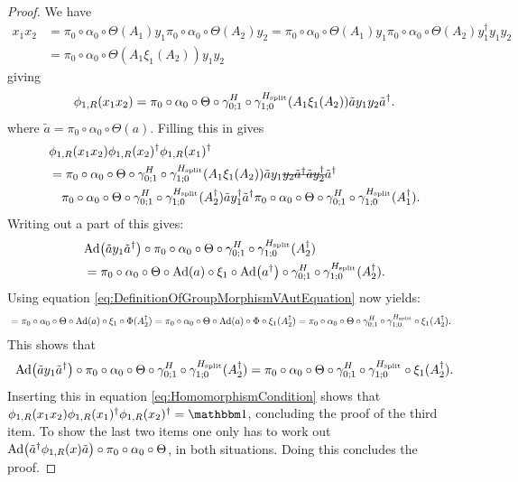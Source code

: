 \documentclass[11pt,a4paper,twoside]{article}
\numberwithin{equation}{section}
\begin{document}
\begin{proof}
		We have
		\begin{align}
			x_1x_2&=\pi_0\circ\alpha_0\circ\Theta(A_1)y_1\pi_0\circ\alpha_0\circ\Theta(A_2)y_2=\pi_0\circ\alpha_0\circ\Theta(A_1)y_1\pi_0\circ\alpha_0\circ\Theta(A_2)y_1^{\dagger}y_1y_2\\
			&=\pi_0\circ\alpha_0\circ\Theta(A_1\xi_1(A_2))y_1y_2
		\end{align}
		giving
		\begin{equation}
			\phi_{1,R}(x_1x_2)=\pi_0\circ\alpha_0\circ\Theta\circ\gamma^H_{0;1}\circ\gamma^{{H_{\text{split}}}}_{1;0}(A_1\xi_1(A_2))\tilde{a}y_1y_2\tilde{a}^\dagger.
		\end{equation}
		where $\tilde{a}=\pi_0\circ\alpha_0\circ\Theta(a)$. Filling this in gives
		\begin{align}
			&\phi_{1,R}(x_1x_2)\phi_{1,R}(x_2)^\dagger\phi_{1,R}(x_1)^\dagger\\
			\label{eq:HomomorphismCondition}
			&=\pi_0\circ\alpha_0\circ\Theta\circ\gamma^H_{0;1}\circ\gamma^{\Hsplit}_{1;0}(A_1\xi_1(A_2))\tilde{a}y_1\stkout{y_2\tilde{a}^\dagger \tilde{a}y_2^\dagger}\tilde{a}^\dagger\\
			\nonumber
			&\quad\pi_0\circ\alpha_0\circ\Theta\circ\gamma^H_{0;1}\circ\gamma^{\Hsplit}_{1;0}(A_2^\dagger)\tilde{a}y_1^\dagger\tilde{a}^\dagger \pi_0\circ\alpha_0\circ\Theta\circ\gamma^H_{0;1}\circ\gamma^{\Hsplit}_{1;0}(A_1^\dagger).
		\end{align}
		Writing out a part of this gives:
		\begin{align}
			&\Ad{\tilde{a}y_1\tilde{a}^\dagger}\circ\pi_0\circ\alpha_0\circ\Theta\circ\gamma^H_{0;1}\circ\gamma^{\Hsplit}_{1;0}(A_2^\dagger)\\
			&=\pi_0\circ\alpha_0\circ\Theta\circ\Ad{a}\circ\xi_1\circ\Ad{a^\dagger}\circ\gamma^H_{0;1}\circ\gamma^{\Hsplit}_{1;0}(A_2^\dagger).
		\end{align}
		Using equation \eqref{eq:DefinitionOfGroupMorphismVAutEquation} now yields:
		\begin{align}
			&=\pi_0\circ\alpha_0\circ\Theta\circ\Ad{a}\circ\xi_1\circ\Phi(A_2^\dagger)=\pi_0\circ\alpha_0\circ\Theta\circ\Ad{a}\circ\Phi\circ\xi_1(A_2^\dagger)=\pi_0\circ\alpha_0\circ\Theta\circ\gamma^H_{0;1}\circ\gamma^{\Hsplit}_{1;0}\circ\xi_1(A_2^\dagger).
		\end{align}
		This shows that
		\begin{equation}
			\Ad{\tilde{a}y_1\tilde{a}^\dagger}\circ\pi_0\circ\alpha_0\circ\Theta\circ\gamma^H_{0;1}\circ\gamma^{\Hsplit}_{1;0}(A_2^\dagger)=\pi_0\circ\alpha_0\circ\Theta\circ\gamma^H_{0;1}\circ\gamma^{\Hsplit}_{1;0}\circ\xi_1(A_2^\dagger).
		\end{equation}
		Inserting this in equation \eqref{eq:HomomorphismCondition} shows that $\phi_{1,R}(x_1x_2)\phi_{1,R}(x_1)^\dagger\phi_{1,R}(x_2)^\dagger=\id$, concluding the proof of the third item. To show the last two items one only has to work out $\Ad{\tilde{a}^\dagger \phi_{1,R}(x)\tilde{a}}\circ\pi_0\circ\alpha_0\circ\Theta$, in both situations. Doing this concludes the proof.
	\end{proof}
\end{document}
